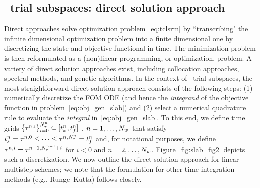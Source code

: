 \subsection{\spatialAcronym\ trial subspaces: direct solution approach}\label{sec:direct} 

Direct approaches solve optimization problem~\eqref{eq:tclsrm} by
``transcribing" the infinite dimensional optimization problem into a finite
dimensional one by discretizing the state and objective functional in time.
The minimization problem is then reformulated as a (non)linear programming, or
optimization, problem. A variety of direct solution approaches exist, 
including collocation approaches, spectral  methods, and genetic algorithms.  
In the context of \spatialAcronym\ trial subspaces, the most straightforward direct solution approach consists of the 
following steps: (1) numerically discretize the FOM ODE (and hence the
\textit{integrand} of the objective function in problem~\eqref{eq:obj_gen_slab}) and 
(2) select a numerical quadrature rule to evaluate the \textit{integral} in~\eqref{eq:obj_gen_slab}.
To this end, we define time grids
$\{\tau^{n,i}\}_{i=0}^{N_{\tau}^{n}}\subseteq[t_s^{n},t_f^{n}]$ ,
$n=1,\ldots,N_w$ that
satisfy 
$t_s^{n}=\tau^{n,0} \le \cdots \le \tau^{n,N_{\tau}^{n}} 
 = t_f^{n}$ and, for notational purposes, we define $\tau^{n,i} = \tau^{n-1,N_{\tau}^{n-1}+i}$ for $i < 0$ and $n=2,\ldots,N_w$.
Figure~\ref{fig:slab_fig2} depicts such a discretization.
We now outline the direct solution approach for linear-multistep schemes; we note that the formulation for
other time-integration methods (e.g., Runge--Kutta) follows closely. 
